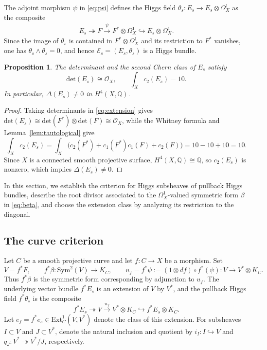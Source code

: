 \documentclass[oneside,11pt]{amsart}
\makeatletter
\newtheorem{prop}[thm]{Proposition}
\theoremstyle{definition}
\theoremstyle{remark}
\let\origsection\section
\renewcommand\section{\@ifstar{\starsection}{\nostarsection}}
\newcommand\nostarsection[1]
{\sectionprelude\origsection{#1}\sectionpostlude}
\newcommand\starsection[1]
{\sectionprelude\origsection*{#1}\sectionpostlude}
\newcommand\sectionprelude{%
  \vspace{1em}
}
\newcommand\sectionpostlude{%
  \vspace{1em}
}
\numberwithin{thm}{section}
\numberwithin{equation}{section}
\makeatother
\begin{document}
The adjoint morphism $\psi$ in \eqref{eq:psi} defines the Higgs field $\theta_s:E_s\longrightarrow E_s\otimes\Omega_X^1$ as the composite
\begin{align}\label{eq:higgs-field}
 E_s\twoheadrightarrow F\xrightarrow{\psi}
 F^*\otimes\Omega_X^1\hookrightarrow E_s\otimes\Omega_X^1.
\end{align}
Since the image of $\theta_s$ is contained in $F^*\otimes\Omega_X^1$ and its restriction to $F^*$ vanishes, one has $\theta_s\wedge\theta_s=0$, and hence $\mathcal{E}_s=(E_s,\theta_s)$ is a Higgs bundle.

\begin{prop}\label{prop:chern}
The determinant and the second Chern class of $E_s$ satisfy
\[
 \mathrm{det}(E_s)\cong\mathcal{O}_X,
 \qquad \int_Xc_2(E_s)=10.
\]
In particular, $\Delta(E_s)\neq0$ in $H^4(X,\mathbb{Q})$.
\end{prop}

\begin{proof}
Taking determinants in \eqref{eq:extension} gives
$\mathrm{det}(E_s)\cong\mathrm{det}(F^*)\otimes\mathrm{det}(F)
\cong\mathcal{O}_X$, while the Whitney formula and
Lemma~\ref{lem:tautological} give
\[
 \int_Xc_2(E_s)
 =\int_X\bigl(c_2(F^*)+c_1(F^*)c_1(F)+c_2(F)\bigr)
 =10-10+10=10.
\]
Since $X$ is a connected smooth projective surface,
$H^4(X,\mathbb{Q})\cong\mathbb{Q}$, so $c_2(E_s)$ is nonzero, which implies $\Delta(E_s)\neq0$.
\end{proof}


\section{Geometry of pullback Higgs bundles}\label{sec:curves}

In this section, we establish the criterion for Higgs subsheaves of pullback Higgs bundles, describe the root divisor associated to the $\Omega_X^1$-valued symmetric form $\beta$ in \eqref{eq:beta}, and choose the extension class by analyzing its restriction to the diagonal.

\subsection{The curve criterion}

Let $C$ be a smooth projective curve and let $f:C\to X$ be a
morphism.  Set
\[
 V=f^*F,\qquad f^*\beta: \mathrm{Sym}^2(V)\longrightarrow K_C,\qquad
 u_f=f^*\psi:=(1\otimes df)\circ f^*(\psi):
 V\longrightarrow V^*\otimes K_C.
\]
Thus $f^*\beta$ is the symmetric form corresponding by adjunction to $u_f$. The underlying vector bundle $f^*E_s$ is an extension of $V$ by $V^*$, and the pullback Higgs field $f^*\theta_s$ is the composite
\[
 f^*E_s\twoheadrightarrow V\xrightarrow{\,u_f\,}
 V^*\otimes K_C\hookrightarrow f^*E_s\otimes K_C.
\]
Let $e_f=f^*e_s\in\mathrm{Ext}^1_C(V,V^*)$ denote the class of this extension.  For subsheaves $I\subset V$ and $J\subset V^*$, denote the natural inclusion and quotient by $i_I:I\hookrightarrow V$ and $q_J:V^*\twoheadrightarrow V^*/J$, respectively.
\end{document}
